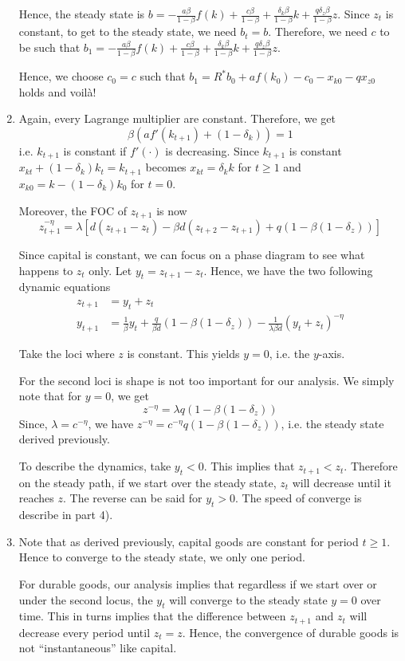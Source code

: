 \documentclass[12pt]{article}
\newcommand{\1}{{\bf 1}} %
\begin{document}
\begin{enumerate}[(1)]
Hence, the steady state is $b=-\frac{a\beta}{1-\beta}f(k)+ \frac{c\beta}{1-\beta}+ \frac{\delta_k\beta}{1-\beta}k+\frac{q\delta_z\beta}{1-\beta} z$. Since $z_t$ is constant, to get to the steady state, we need $b_t=b$. Therefore, we need $c$ to be such that $b_1 = -\frac{a\beta}{1-\beta}f(k)+ \frac{c\beta}{1-\beta}+ \frac{\delta_k\beta}{1-\beta}k+\frac{q\delta_z\beta}{1-\beta} z$.

Hence, we choose $c_0=c$ such that $b_{1}=R^*b_0+af(k_0)- c_0-x_{k0}-qx_{z0}$ holds and voil\`a!

	\item 
	
	Again, every Lagrange multiplier are constant. Therefore, we get
	\[
	\beta(af'(k_{t+1})+(1-\delta_k))=1
	\]
	i.e. $k_{t+1}$ is constant if $f'(\cdot)$ is decreasing. Since $k_{t+1}$ is constant $x_{kt}+(1-\delta_k)k_t= k_{t+1}$ becomes $x_{kt}=\delta_kk$ for $t\geq 1$ and $x_{k0}=k-(1-\delta_k)k_0$ for $t=0$.
	
	Moreover, the FOC of $z_{t+1}$ is now
	\[
	z_{t+1}^{-\eta}= \lambda [d(z_{t+1}-z_t)-\beta d(z_{t+2}-z_{t+1})+q(1- \beta (1-\delta_z) )]
	\]
	
	Since capital is constant, we can focus on a phase diagram to see what happens to $z_t$ only. Let $y_t= z_{t+1}-z_t$. Hence, we have the two following dynamic equations
	\begin{align*}
		z_{t+1} & = y_t + z_t\\
	y_{t+1}&= \frac{1}{\beta }y_{t} + \frac{q}{\beta d}(1- \beta (1-\delta_z) ) -\frac{1}{\lambda \beta d}(y_{t}+z_{t})^{-\eta}
	\end{align*}
	
	Take the loci where $z$ is constant. This yields $y=0$, i.e. the $y$-axis.
	
	For the second loci is shape is not too important for our analysis. We simply note that for $y=0$, we get
	\[
		z ^{-\eta} = \lambda q(1-\beta(1-\delta_z))
	\]
	Since, $\lambda = c^{-\eta}$, we have $z ^{-\eta} = c^{-\eta} q(1-\beta(1-\delta_z))$, i.e. the steady state derived previously.
	
	To describe the dynamics, take $y_t<0$. This implies that $z_{t+1}<z_t$. Therefore on the steady path, if we start over the steady state, $z_t$ will decrease until it reaches $z$. The reverse can be said for $y_t>0$. The speed of converge is describe in part 4).

	\item 
	
	Note that as derived previously, capital goods are constant for period $t\geq 1$. Hence to converge to the steady state, we only one period.
	
	For durable goods, our analysis implies that regardless if we start over or under the second locus, the $y_t$ will converge to the steady state $y=0$ over time. This in turns implies that the difference between $z_{t+1}$ and $z_{t}$ will decrease every period until $z_t=z$. Hence, the convergence of durable goods is not ``instantaneous'' like capital.
\end{enumerate}
	
\end{document}
